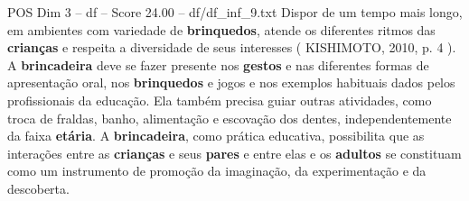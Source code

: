 \begin{textsample}{POS Dim 3 – df – Score 24.00 – df/df\_inf\_9.txt}
Dispor de um tempo mais longo, em ambientes com variedade de \textbf{brinquedos}, atende os diferentes ritmos das \textbf{crianças} e respeita a diversidade de seus interesses ( KISHIMOTO, 2010, p. 4 ).
A \textbf{brincadeira} deve se fazer presente nos \textbf{gestos} e nas diferentes formas de apresentação oral, nos \textbf{brinquedos} e jogos e nos exemplos habituais dados pelos profissionais da educação.
Ela também precisa guiar outras atividades, como troca de fraldas, banho, alimentação e escovação dos dentes, independentemente da faixa \textbf{etária}.
A \textbf{brincadeira}, como prática educativa, possibilita que as interações entre as \textbf{crianças} e seus \textbf{pares} e entre elas e os \textbf{adultos} se constituam como um instrumento de promoção da imaginação, da experimentação e da descoberta.

\end{textsample}
